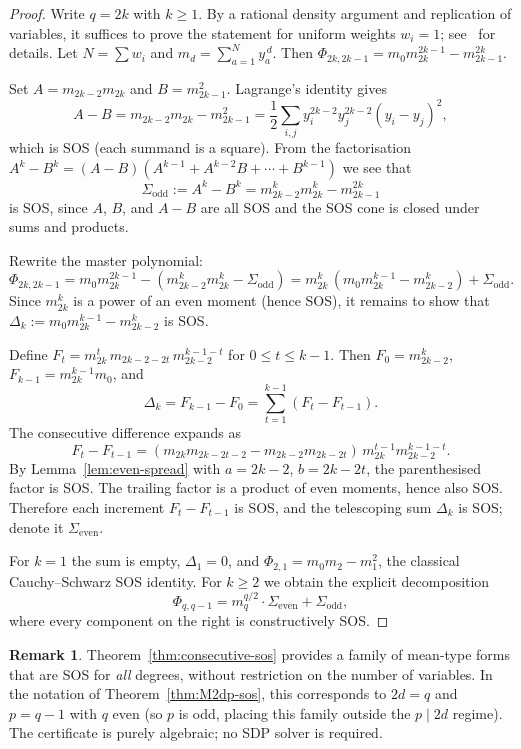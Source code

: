 \documentclass{amsart}
\theoremstyle{definition}
\newtheorem{rem}[thm]{Remark}
\numberwithin{equation}{section}
\begin{document}
\begin{proof}
Write $q=2k$ with $k\ge1$.  By a rational density argument and replication
of variables, it suffices to prove the statement for uniform weights
$w_i=1$; see~\cite[Lemma~2.1]{GM01} for details.  Let
$N=\sum w_i$ and $m_d=\sum_{a=1}^N y_a^{\,d}$.
Then $\Phi_{2k,2k-1}=m_0m_{2k}^{2k-1}-m_{2k-1}^{2k}$.

Set $A=m_{2k-2}m_{2k}$ and $B=m_{2k-1}^2$.  Lagrange's identity gives
\[
A-B=m_{2k-2}m_{2k}-m_{2k-1}^2
=\frac12\sum_{i,j}y_i^{2k-2}y_j^{2k-2}(y_i-y_j)^2,
\]
which is SOS (each summand is a square).  From the factorisation
$A^k-B^k=(A-B)(A^{k-1}+A^{k-2}B+\cdots+B^{k-1})$ we see that
\[
\Sigma_{\mathrm{odd}}:=A^k-B^k=m_{2k-2}^k m_{2k}^k-m_{2k-1}^{2k}
\]
is SOS, since $A$, $B$, and $A-B$ are all SOS and the SOS cone is closed
under sums and products.

Rewrite the master polynomial:
\[
\Phi_{2k,2k-1}
=m_0m_{2k}^{2k-1}-(m_{2k-2}^k m_{2k}^k-\Sigma_{\mathrm{odd}})
=m_{2k}^k\,(m_0m_{2k}^{k-1}-m_{2k-2}^k)+\Sigma_{\mathrm{odd}}.
\]
Since $m_{2k}^k$ is a power of an even moment (hence SOS), it remains to
show that $\Delta_k:=m_0m_{2k}^{k-1}-m_{2k-2}^k$ is SOS.

Define $F_t=m_{2k}^t\,m_{2k-2-2t}\,m_{2k-2}^{k-1-t}$ for $0\le t\le k-1$.
Then $F_0=m_{2k-2}^k$, $F_{k-1}=m_{2k}^{k-1}m_0$, and
\[
\Delta_k=F_{k-1}-F_0=\sum_{t=1}^{k-1}(F_t-F_{t-1}).
\]
The consecutive difference expands as
\[
F_t-F_{t-1}
=(m_{2k}m_{2k-2t-2}-m_{2k-2}m_{2k-2t})\,
m_{2k}^{t-1}m_{2k-2}^{k-1-t}.
\]
By Lemma~\ref{lem:even-spread} with $a=2k-2$, $b=2k-2t$, the parenthesised
factor is SOS.  The trailing factor is a product of even moments, hence also
SOS.  Therefore each increment $F_t-F_{t-1}$ is SOS, and the telescoping sum
$\Delta_k$ is SOS; denote it $\Sigma_{\mathrm{even}}$.

For $k=1$ the sum is empty, $\Delta_1=0$, and
$\Phi_{2,1}=m_0m_2-m_1^2$, the classical Cauchy--Schwarz SOS identity.
For $k\ge2$ we obtain the explicit decomposition
\[
\Phi_{q,q-1}=m_q^{q/2}\cdot\Sigma_{\mathrm{even}}+\Sigma_{\mathrm{odd}},
\]
where every component on the right is constructively SOS.
\end{proof}

\begin{rem}\label{rem:consecutive}
Theorem~\ref{thm:consecutive-sos} provides a family of mean-type forms that
are SOS for \emph{all} degrees, without restriction on the number of
variables.  In the notation of Theorem~\ref{thm:M2dp-sos}, this corresponds
to $2d=q$ and $p=q-1$ with $q$ even (so $p$ is odd, placing this family
outside the $p\mid2d$ regime).  The certificate is purely algebraic; no SDP
solver is required.
\end{rem}
\end{document}
